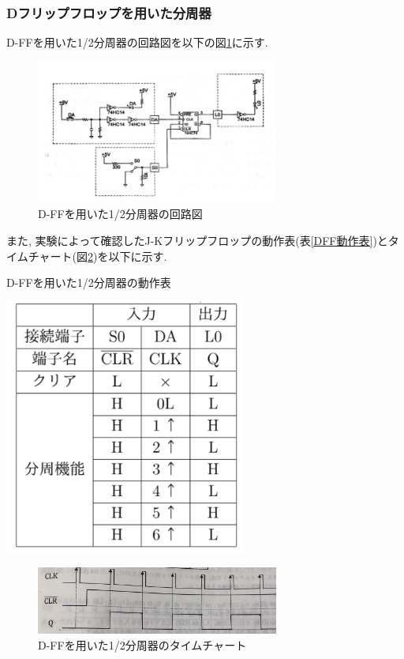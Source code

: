\documentclass[a4paper, 11pt, uplatex]{jsarticle}
\begin{document}
\subsubsection{Dフリップフロップを用いた分周器}

D-FFを用いた1/2分周器の回路図を以下の図\ref{Dフリップフロップ回路}に示す.

\begin{figure}[H]
  \begin{center}
    \includegraphics[width = 8cm]{画像/分周器.png}
    \caption{D-FFを用いた1/2分周器の回路図}
    \label{Dフリップフロップ回路}
  \end{center}
\end{figure}

また,  実験によって確認したJ-Kフリップフロップの動作表(表\ref{DFF動作表})とタイムチャート(図\ref{DFFタイムチャート})を以下に示す.

\begin{table}[H]
  \begin{center}
    \caption{D-FFを用いた1/2分周器の動作表}
    \includegraphics[width = 8cm]{画像/DFF動作表.png}
    \label{DFF動作表}
  \end{center}
\end{table}

\begin{figure}[H]
  \begin{center}
    \includegraphics[width = 8cm]{画像/DFFタイムチャート.jpg}
    \caption{D-FFを用いた1/2分周器のタイムチャート}
    \label{DFFタイムチャート}
  \end{center}
\end{figure}
\end{document}
